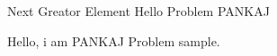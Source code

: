 \begin{problem}{Next Greator Element}
    Hello Problem PANKAJ
\end{problem}

Hello, i am PANKAJ Problem sample.
